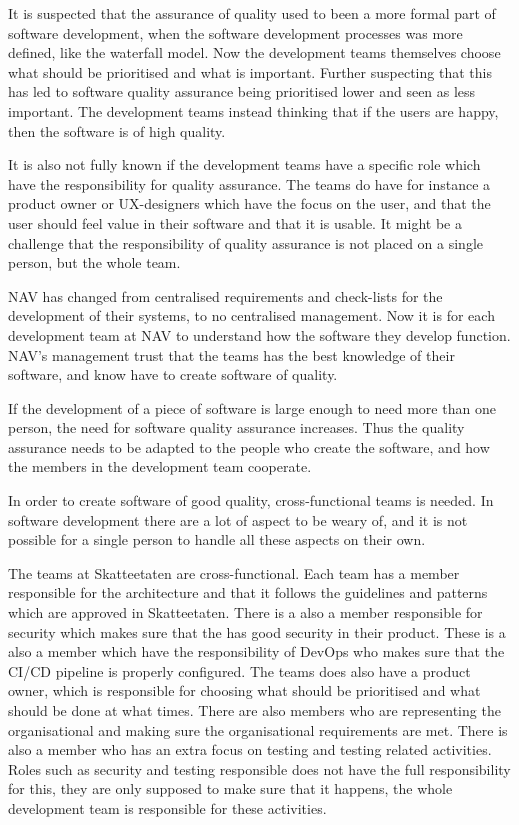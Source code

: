 It is suspected that the assurance of quality used to been a more formal part of software development, when the software development processes was more defined, like the waterfall model. Now the development teams themselves choose what should be prioritised and what is important. Further suspecting that this has led to software quality assurance being prioritised lower and seen as less important. The development teams instead thinking that if the users are happy, then the software is of high quality.

It is also not fully known if the development teams have a specific role which have the responsibility for quality assurance. The teams do have for instance a product owner or UX-designers which have the focus on the user, and that the user should feel value in their software and that it is usable. It might be a challenge that the responsibility of quality assurance is not placed on a single person, but the whole team.

NAV has changed from centralised requirements and check-lists for the development of their systems, to no centralised management. Now it is for each development team at NAV to understand how the software they develop function. NAV's management trust that the teams has the best knowledge of their software, and know have to create software of quality.

If the development of a piece of software is large enough to need more than one person, the need for software quality assurance increases. Thus the quality assurance needs to be adapted to the people who create the software, and how the members in the development team cooperate.

In order to create software of good quality, cross-functional teams is needed. In software development there are a lot of aspect to be weary of, and it is not possible for a single person to handle all these aspects on their own.

The teams at Skatteetaten are cross-functional. Each team has a member responsible for the architecture and that it follows the guidelines and patterns which are approved in Skatteetaten. There is a also a member responsible for security which makes sure that the has good security in their product. These is a also a member which have the responsibility of DevOps who makes sure that the CI/CD pipeline is properly configured. The teams does also have a product owner, which is responsible for choosing what should be prioritised and what should be done at what times. There are also members who are representing the organisational and making sure the organisational requirements are met. There is also a member who has an extra focus on testing and testing related activities. Roles such as security and testing responsible does not have the full responsibility for this, they are only supposed to make sure that it happens, the whole development team is responsible for these activities. 

